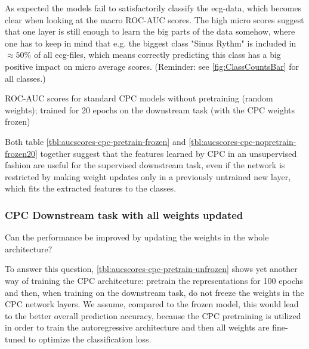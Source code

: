 As expected the models fail to satisfactorily classify the ecg-data, which becomes clear when looking at the macro ROC-AUC scores. The high micro scores suggest that one layer is still enough to learn the big parts of the data somehow, where one has to keep in mind that e.g. the biggest class "Sinus Rythm" is included in $\approx50\%$ of all ecg-files, which means correctly predicting this class has a big positive impact on micro average scores. (Reminder: see \autoref{fig:ClassCountsBar} for all classes.)
\begin{table}\centering
	\resizebox{\textwidth}{!}{
		
	}
	\caption{ROC-AUC scores for standard CPC models without pretraining (random weights); trained for 20 epochs on the downstream task (with the CPC weights frozen)}
	\label{tbl:aucscores-cpc-nopretrain-frozen20}
\end{table}
Both table \autoref{tbl:aucscores-cpc-pretrain-frozen} and \autoref{tbl:aucscores-cpc-nopretrain-frozen20} together suggest that the features learned by CPC in an unsupervised fashion are useful for the supervised downstream task, even if the network is restricted by making weight updates only in a previously untrained new layer, which fits the extracted features to the classes.

\subsubsection{CPC Downstream task with all weights updated}
Can the performance be improved by updating the weights in the whole architecture?

To answer this question, \autoref{tbl:aucscores-cpc-pretrain-unfrozen} shows yet another way of training the CPC architecture: pretrain the representations for 100 epochs and then, when training on the downstream task, do not freeze the weights in the CPC network layers. We assume, compared to the frozen model, this would lead to the better overall prediction accuracy, because the CPC pretraining is utilized in order to train the autoregressive architecture and then all weights are fine-tuned to optimize the classification loss.

